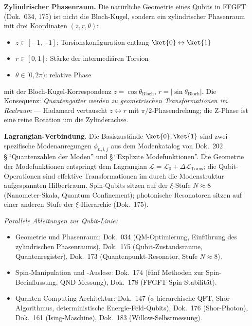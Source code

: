 \textbf{Zylindrischer Phasenraum.} Die natürliche Geometrie eines
Qubits in FFGFT (Dok.~034, 175) ist nicht die Bloch-Kugel, sondern
ein zylindrischer Phasenraum mit drei Koordinaten $(z, r, \theta)$:
\begin{itemize}\setlength\itemsep{0pt}
  \item $z \in [-1, +1]$: Torsions\-konfiguration entlang
        $\ket{0} \leftrightarrow \ket{1}$
  \item $r \in [0, 1]$: Stärke der intermediären Torsion
  \item $\theta \in [0, 2\pi)$: relative Phase
\end{itemize}
mit der Bloch-Kugel-Korrespondenz $z = \cos\theta_{\text{Bloch}}$,
$r = |\sin\theta_{\text{Bloch}}|$. Die Konsequenz: \emph{Quantengatter
werden zu geometrischen Transformationen im Realraum} --- Hadamard
vertauscht $z \leftrightarrow r$ mit $\pi/2$-Phasendrehung; die
Z-Phase ist eine reine Rotation um die Zylinderachse.

\textbf{Lagrangian-Verbindung.} Die Basiszustände $\ket{0}, \ket{1}$
sind zwei spezifische Modenanregungen $\phi_{n,l,j}$ aus dem
Modenkatalog von Dok.~202 \S\,\enquote{Quantenzahlen der Moden}
und \S\,\enquote{Explizite Modefunktionen}. Die Geometrie der
Modefunktionen entspringt dem Lagrangian
$\mathcal{L} = \mathcal{L}_0 + \Delta\mathcal{L}_{\text{Torus}}$;
die Qubit-Operationen sind effektive Transformationen im durch die
Modenstruktur aufgespannten Hilbertraum. Spin-Qubits sitzen auf der
$\xi$-Stufe $N \approx 8$ (Nanometer-Skala, Quantum Confinement);
photonische Resonatoren sitzen auf einer anderen Stufe der
$\xi$-Hierarchie (Dok.~175).

\textit{Parallele Ableitungen zur Qubit-Linie:}
\begin{itemize}\setlength\itemsep{0pt}
  \item Geometrie und Phasenraum:
        Dok.~034 (QM-Optimierung, Einführung des zylindrischen
        Phasenraums),
        Dok.~175 (Qubit-Zustandsräume, Quantenregister),
        Dok.~173 (Quantenpunkt-Resonator, Stufe $N \approx 8$).
  \item Spin-Manipulation und -Auslese:
        Dok.~174 (fünf Methoden zur Spin-Beeinflussung,
        QND-Messung),
        Dok.~178 (FFGFT-Spin-Stabilität).
  \item Quanten-Computing-Architektur:
        Dok.~147 ($\phi$-hierarchische QFT, Shor-Algorithmus,
        deterministische Energie-Feld-Qubits),
        Dok.~176 (Shor-Photon),
        Dok.~161 (Ising-Maschine),
        Dok.~183 (Willow-Selbstmessung).
\end{itemize}

